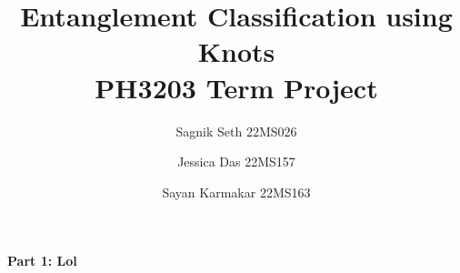 \documentclass{beamer}
\title[Entanglement using Knots]{Entanglement Classification using Knots \\{\small PH3203 Term Project}}
\author[Seth, Das, Karmakar]{{ Sagnik Seth} {\tiny{22MS026}} \and { Jessica  Das}  {\tiny{22MS157}} \and { Sayan Karmakar}  {\tiny{22MS163}}}
\date{}
\begin{document}
	
	\frame{\titlepage}
	
	
	\begin{frame}
		\begin{center}
			\textbf{\large Part 1: Lol}
		\end{center}
	\end{frame}
\end{document}
